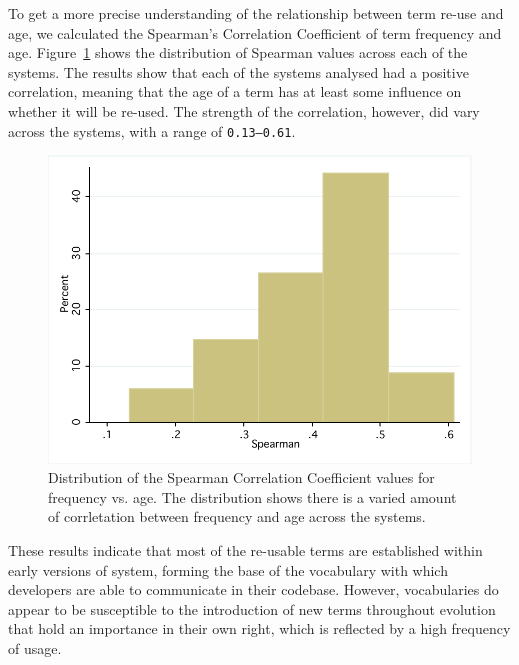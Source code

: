 To get a more precise understanding of the relationship between term re-use and age, we calculated the Spearman's Correlation Coefficient of term frequency and age. Figure~\ref{fig:vocab-freqage-spearman-dist} shows the distribution of Spearman values across each of the systems. The results show that each of the systems analysed had a positive correlation, meaning that the age of a term has at least some influence on whether it will be re-used. The strength of the correlation, however, did vary across the systems, with a range of \texttt{0.13--0.61}.

\begin{figure}[t]
\centering
\includegraphics[width=\textwidth]{Figures/Vocab-FrequencyAgeSpearmanDist.pdf}
\caption{Distribution of the Spearman Correlation Coefficient values for frequency vs. age. The distribution shows there is a varied amount of corrletation between frequency and age across the systems.}
\label{fig:vocab-freqage-spearman-dist}
\end{figure}

These results indicate that most of the re-usable terms are established within early versions of system, forming the base of the vocabulary with which developers are able to communicate in their codebase. However, vocabularies do appear to be susceptible to the introduction of new terms throughout evolution that hold an importance in their own right, which is reflected by a high frequency of usage.




